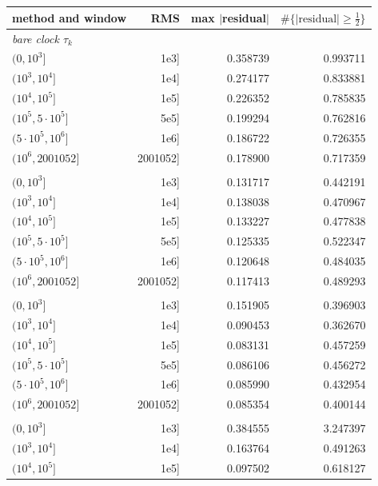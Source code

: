 \documentclass[11pt,reqno]{amsart}
\numberwithin{equation}{section}
\theoremstyle{plain}
\theoremstyle{definition}
\theoremstyle{remark}
\begin{document}
\begin{table}[htbp]
\centering
\small
\begin{tabular}{lrrr}
\toprule
method and window & RMS & max $|$residual$|$ & $\#\{|\text{residual}|\ge\frac12\}$\\
\midrule
\multicolumn{4}{l}{\textit{bare clock $\tau_k$}}\\
\quad $(0,10^3]$ & 1e3] & 0.358739 & 0.993711\\
\quad $(10^3,10^4]$ & 1e4] & 0.274177 & 0.833881\\
\quad $(10^4,10^5]$ & 1e5] & 0.226352 & 0.785835\\
\quad $(10^5,5\cdot10^5]$ & 5e5] & 0.199294 & 0.762816\\
\quad $(5\cdot10^5,10^6]$ & 1e6] & 0.186722 & 0.726355\\
\quad $(10^6,2001052]$ & 2001052] & 0.178900 & 0.717359\\
\addlinespace
\multicolumn{4}{l}{\textit{$P=\{2,3,5,7\}$, $B=0.6$}}\\
\quad $(0,10^3]$ & 1e3] & 0.131717 & 0.442191\\
\quad $(10^3,10^4]$ & 1e4] & 0.138038 & 0.470967\\
\quad $(10^4,10^5]$ & 1e5] & 0.133227 & 0.477838\\
\quad $(10^5,5\cdot10^5]$ & 5e5] & 0.125335 & 0.522347\\
\quad $(5\cdot10^5,10^6]$ & 1e6] & 0.120648 & 0.484035\\
\quad $(10^6,2001052]$ & 2001052] & 0.117413 & 0.489293\\
\addlinespace
\multicolumn{4}{l}{\textit{$P=\{p\le 61\}$, $B=0.6$}}\\
\quad $(0,10^3]$ & 1e3] & 0.151905 & 0.396903\\
\quad $(10^3,10^4]$ & 1e4] & 0.090453 & 0.362670\\
\quad $(10^4,10^5]$ & 1e5] & 0.083131 & 0.457259\\
\quad $(10^5,5\cdot10^5]$ & 5e5] & 0.086106 & 0.456272\\
\quad $(5\cdot10^5,10^6]$ & 1e6] & 0.085990 & 0.432954\\
\quad $(10^6,2001052]$ & 2001052] & 0.085354 & 0.400144\\
\addlinespace
\multicolumn{4}{l}{\textit{$P=\{p\le 1999\}$, no saturation}}\\
\quad $(0,10^3]$ & 1e3] & 0.384555 & 3.247397\\
\quad $(10^3,10^4]$ & 1e4] & 0.163764 & 0.491263\\
\quad $(10^4,10^5]$ & 1e5] & 0.097502 & 0.618127\\

\end{tabular}
\end{table}
\end{document}
